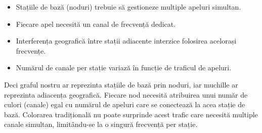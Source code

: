\begin{itemize}
  \begin{itemize}
    \item Stațiile de bază (noduri) trebuie să gestioneze multiple apeluri simultan.
    \item Fiecare apel necesită un canal de frecvență dedicat.
    \item Interferența geografică între stații adiacente interzice folosirea acelorași frecvențe. 
    \item Numărul de canale per stație variază în funcție de traficul de apeluri.
  \end{itemize}
  Deci graful nostru ar reprezinta stațiile de bază prin noduri, iar muchille ar reprezinta adiacența geografică. Fiecare nod necesită atribuirea unui număr de culori (canale) egal cu numărul de apeluri care se conectează la acea stație de bază. Colorarea tradițională nu poate surprinde acest trafic care necesită multiple canale simultan, limitându-se la o singură frecvență per stație.
\end{itemize}
